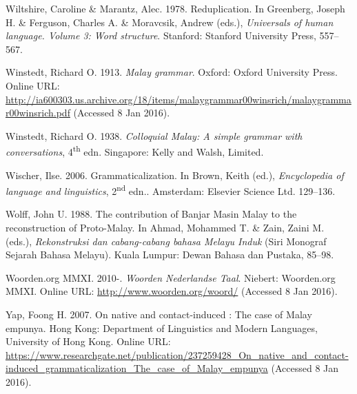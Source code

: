 \begin{styleCitaviBibliographyEntry}
Wiltshire, Caroline \& Marantz, Alec. 1978. Reduplication. In Greenberg, Joseph H. \& Ferguson, Charles A. \& Moravcsik, Andrew (eds.), \textit{Universals of human language. Volume 3: Word structure}. Stanford: Stanford University Press, 557–567.
\end{styleCitaviBibliographyEntry}

\begin{styleCitaviBibliographyEntry}
Winstedt, Richard O. 1913. \textit{Malay grammar}. Oxford: Oxford University Press. Online URL: \url{http://ia600303.us.archive.org/18/items/malaygrammar00winsrich/malaygrammar00winsrich.pdf} (Accessed 8 Jan 2016).
\end{styleCitaviBibliographyEntry}

\begin{styleCitaviBibliographyEntry}
Winstedt, Richard O. 1938. \textit{Colloquial Malay: A simple grammar with conversations}, 4\textsuperscript{th} edn. Singapore: Kelly and Walsh, Limited.
\end{styleCitaviBibliographyEntry}

\begin{styleCitaviBibliographyEntry}
Wischer, Ilse. 2006. Grammaticalization. In Brown, Keith (ed.), \textit{Encyclopedia of language and linguistics}, 2\textsuperscript{nd} edn.. Amsterdam: Elsevier Science Ltd. 129–136.
\end{styleCitaviBibliographyEntry}

\begin{styleCitaviBibliographyEntry}
Wolff, John U. 1988. The contribution of Banjar Masin Malay to the reconstruction of Proto-Malay. In Ahmad, Mohammed T. \& Zain, Zaini M. (eds.), \textit{Rekonstruksi dan cabang-cabang bahasa Melayu Induk} (Siri Monograf Sejarah Bahasa Melayu). Kuala Lumpur: Dewan Bahasa dan Pustaka, 85–98.
\end{styleCitaviBibliographyEntry}

\begin{styleCitaviBibliographyEntry}
Woorden.org MMXI. 2010-. \textit{Woorden Nederlandse Taal}. Niebert: Woorden.org MMXI. Online URL: \url{http://www.woorden.org/woord/} (Accessed 8 Jan 2016).
\end{styleCitaviBibliographyEntry}

\begin{styleCitaviBibliographyEntry}
Yap, Foong H. 2007. On native and contact-induced : The case of Malay empunya. Hong Kong: Department of Linguistics and Modern Languages,  University of Hong Kong. Online URL: \url{https://www.researchgate.net/publication/237259428_On_native_and_contact-induced_grammaticalization_The_case_of_Malay_empunya} (Accessed 8 Jan 2016).
\end{styleCitaviBibliographyEntry}


